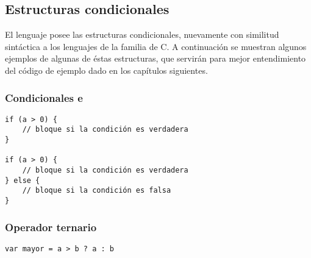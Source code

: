 \subsection{Estructuras condicionales}

El lenguaje posee las estructuras condicionales, nuevamente con similitud sintáctica a los lenguajes de la familia de C. A continuación se muestran algunos ejemplos de algunas de éstas estructuras, que servirán para mejor entendimiento del código de ejemplo dado en los capítulos siguientes.

\subsubsection{Condicionales  e }

\begin{lstlisting}[title={Ejemplos de \code{if} e \code{if-else}}]
if (a > 0) {
	// bloque si la condición es verdadera 
}

if (a > 0) {
	// bloque si la condición es verdadera
} else {
	// bloque si la condición es falsa
}
\end{lstlisting}

\subsubsection{Operador ternario }

\begin{lstlisting}[title={Operador ternario \code{?:}}]
var mayor = a > b ? a : b
\end{lstlisting}